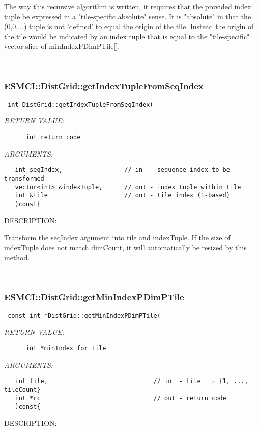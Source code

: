       The way this recursive algorithm is written, it requires that the 
      provided index tuple be expressed in a "tile-specific absolute" sense.
      It is "absolute" in that the (0,0,...) tuple is not 'defined' to
      equal the origin of the tile. Instead the origin of the tile would
      be indicated by an index tuple that is equal to the "tile-specific"
      vector slice of minIndexPDimPTile[].
   
 
\mbox{}\hrulefill\
 
\subsubsection [ESMCI::DistGrid::getIndexTupleFromSeqIndex] {ESMCI::DistGrid::getIndexTupleFromSeqIndex}


  
\begin{verbatim} int DistGrid::getIndexTupleFromSeqIndex(\end{verbatim}{\em RETURN VALUE:}
\begin{verbatim}      int return code\end{verbatim}{\em ARGUMENTS:}
\begin{verbatim}   int seqIndex,                 // in  - sequence index to be transformed
   vector<int> &indexTuple,      // out - index tuple within tile
   int &tile                     // out - tile index (1-based)
   )const{\end{verbatim}
{\sf DESCRIPTION:\\ }


      Transform the seqIndex argument into tile and indexTuple. If the size 
      of indexTuple does not match dimCount, it will automatically be resized 
      by this method.
   
 
\mbox{}\hrulefill\
 
\subsubsection [ESMCI::DistGrid::getMinIndexPDimPTile] {ESMCI::DistGrid::getMinIndexPDimPTile}


  
\begin{verbatim} const int *DistGrid::getMinIndexPDimPTile(\end{verbatim}{\em RETURN VALUE:}
\begin{verbatim}      int *minIndex for tile\end{verbatim}{\em ARGUMENTS:}
\begin{verbatim}   int tile,                             // in  - tile   = {1, ..., tileCount}
   int *rc                               // out - return code
   )const{\end{verbatim}
{\sf DESCRIPTION:\\ }


